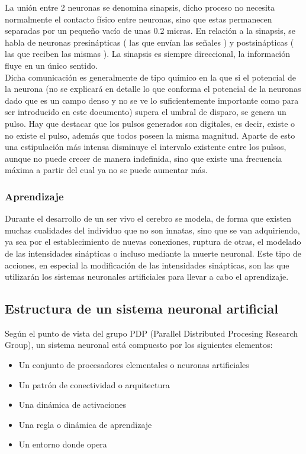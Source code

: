 \documentclass[11pt, oneside]{article}   	%
\begin{document}
La unión entre 2 neuronas se denomina sinapsis, dicho proceso no necesita normalmente el contacto físico entre neuronas,
sino que estas permanecen separadas por un pequeño vacío de unas 0.2 micras. En relación a la sinapsis, se habla de
neuronas presinápticas ( las que envían las señales ) y postsinápticas ( las que reciben las mismas ). La sinapsis es
siempre direccional, la información fluye en un único sentido.\\

Dicha comunicación es generalmente de tipo químico en la que si el potencial de la neurona (no se explicará en detalle
lo que conforma el potencial de la neuronas dado que es un campo denso y no se ve lo suficientemente importante como
para ser introducido en este documento) supera el umbral de disparo, se genera un pulso. Hay que destacar que los pulsos
generados son digitales, es decir, existe o no existe el pulso, además que todos poseen la misma magnitud. Aparte de
esto una estipulación más intensa disminuye el intervalo existente entre los pulsos, aunque no puede crecer de manera
indefinida, sino que existe una frecuencia máxima a partir del cual ya no se puede aumentar más.\\

\subsubsection{Aprendizaje}

Durante el desarrollo de un ser vivo el cerebro se modela, de forma que existen muchas cualidades del individuo que no
son innatas, sino que se van adquiriendo, ya sea por el establecimiento de nuevas conexiones, ruptura de otras, el
modelado de las intensidades sinápticas o incluso mediante la muerte neuronal. Este tipo de acciones, en especial la
modificación de las intensidades sinápticas, son las que utilizarán los sistemas neuronales artificiales para llevar a
cabo el aprendizaje.\\

\subsection{Estructura de un sistema neuronal artificial}

Según el punto de vista del grupo PDP (Parallel Distributed Procesing Research Group), un sistema neuronal está compuesto por los siguientes elementos:

\begin{itemize}
\item Un conjunto de procesadores elementales o neuronas artificiales
\item Un patrón de conectividad o arquitectura
\item Una dinámica de activaciones
\item Una regla o dinámica de aprendizaje
\item Un entorno donde opera
\end{itemize}
\end{document}
